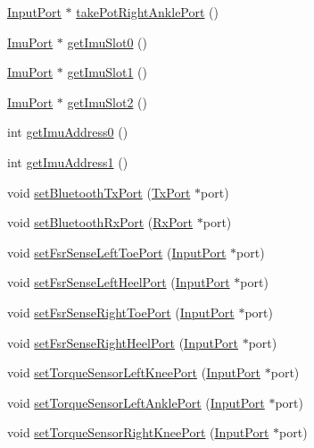 \begin{DoxyCompactItemize}
\item 
\hyperlink{classInputPort}{Input\+Port} $\ast$ \hyperlink{classBoard_ad580a6bc7986156eeb69ea50a02f1563}{take\+Pot\+Right\+Ankle\+Port} ()
\item 
\hyperlink{classImuPort}{Imu\+Port} $\ast$ \hyperlink{classBoard_a732e8cf1e3d1242b89c1f1409131c980}{get\+Imu\+Slot0} ()
\item 
\hyperlink{classImuPort}{Imu\+Port} $\ast$ \hyperlink{classBoard_af5f81580ae8f615858fb5cdb74d9f494}{get\+Imu\+Slot1} ()
\item 
\hyperlink{classImuPort}{Imu\+Port} $\ast$ \hyperlink{classBoard_a84c16ed6f01fd9075f2f393598df2962}{get\+Imu\+Slot2} ()
\item 
int \hyperlink{classBoard_a8ac6af90e1b7c3747dec6a2717e4e0c9}{get\+Imu\+Address0} ()
\item 
int \hyperlink{classBoard_a2a5914d7897e0e293a6c270e35a8d770}{get\+Imu\+Address1} ()
\item 
void \hyperlink{classBoard_a2dadb15f722d1b1e5326fb016dc5af60}{set\+Bluetooth\+Tx\+Port} (\hyperlink{classTxPort}{Tx\+Port} $\ast$port)
\item 
void \hyperlink{classBoard_aa8f470af0dabf15e8208a8a85f3bfdb6}{set\+Bluetooth\+Rx\+Port} (\hyperlink{classRxPort}{Rx\+Port} $\ast$port)
\item 
void \hyperlink{classBoard_a8c0e8c5827e4119797c421df8374b493}{set\+Fsr\+Sense\+Left\+Toe\+Port} (\hyperlink{classInputPort}{Input\+Port} $\ast$port)
\item 
void \hyperlink{classBoard_a5ec129c18aaf991f8f94e981f13a4905}{set\+Fsr\+Sense\+Left\+Heel\+Port} (\hyperlink{classInputPort}{Input\+Port} $\ast$port)
\item 
void \hyperlink{classBoard_aad8cd688c1c492c767d8c7e795344389}{set\+Fsr\+Sense\+Right\+Toe\+Port} (\hyperlink{classInputPort}{Input\+Port} $\ast$port)
\item 
void \hyperlink{classBoard_a303a71aa15a467f0ffea207e6621b8cd}{set\+Fsr\+Sense\+Right\+Heel\+Port} (\hyperlink{classInputPort}{Input\+Port} $\ast$port)
\item 
void \hyperlink{classBoard_ae45adf7a5640338344156fdd32822178}{set\+Torque\+Sensor\+Left\+Knee\+Port} (\hyperlink{classInputPort}{Input\+Port} $\ast$port)
\item 
void \hyperlink{classBoard_af667f98775160ebdbc4cc8ee31cbe910}{set\+Torque\+Sensor\+Left\+Ankle\+Port} (\hyperlink{classInputPort}{Input\+Port} $\ast$port)
\item 
void \hyperlink{classBoard_a8a4b37dc0833c39a644b99f3edd16b9f}{set\+Torque\+Sensor\+Right\+Knee\+Port} (\hyperlink{classInputPort}{Input\+Port} $\ast$port)

\end{DoxyCompactItemize}
